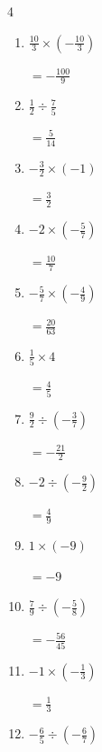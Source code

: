 \begin{multicols}{4}
\begin{enumerate}
  \item $\displaystyle \frac{10}{3}\times{}\left(-\frac{10}{3}\right)$

        $\displaystyle =-\frac{100}{9}$

  \item $\displaystyle \frac{1}{2}\div{}\frac{7}{5}$

        $\displaystyle =\frac{5}{14}$

  \item $\displaystyle -\frac{3}{2}\times{}\left(-1\right)$

        $\displaystyle =\frac{3}{2}$

  \item $\displaystyle -2\times{}\left(-\frac{5}{7}\right)$

        $\displaystyle =\frac{10}{7}$

  \item $\displaystyle -\frac{5}{7}\times{}\left(-\frac{4}{9}\right)$

        $\displaystyle =\frac{20}{63}$

  \item $\displaystyle \frac{1}{5}\times{}4$

        $\displaystyle =\frac{4}{5}$

  \item $\displaystyle \frac{9}{2}\div{}\left(-\frac{3}{7}\right)$

        $\displaystyle =-\frac{21}{2}$

\columnbreak %

  \item $\displaystyle -2\div{}\left(-\frac{9}{2}\right)$

        $\displaystyle =\frac{4}{9}$

  \item $\displaystyle 1\times{}\left(-9\right)$

        $\displaystyle =-9$

  \item $\displaystyle \frac{7}{9}\div{}\left(-\frac{5}{8}\right)$

        $\displaystyle =-\frac{56}{45}$

  \item $\displaystyle -1\times{}\left(-\frac{1}{3}\right)$

        $\displaystyle =\frac{1}{3}$

  \item $\displaystyle -\frac{6}{5}\div{}\left(-\frac{6}{7}\right)$


\end{enumerate}
\end{multicols}
